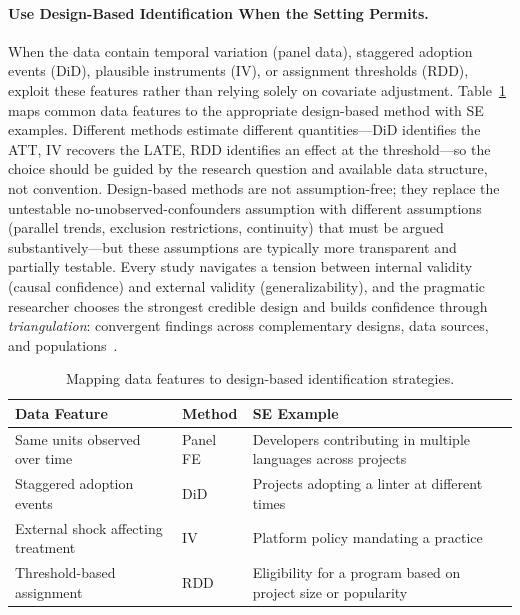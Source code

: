 \paragraph{Use Design-Based Identification When the Setting Permits.}
\label{sec:guide-identification}
\label{sec:guide-path-b}
When the data contain temporal variation (panel data), staggered adoption events (DiD), plausible instruments (IV), or assignment thresholds (RDD), exploit these features rather than relying solely on covariate adjustment.
Table~\ref{tab:design-features} maps common data features to the appropriate design-based method with SE examples.
Different methods estimate different quantities---DiD identifies the ATT, IV recovers the LATE, RDD identifies an effect at the threshold---so the choice should be guided by the research question and available data structure, not convention.
Design-based methods are not assumption-free; they replace the untestable no-unobserved-confounders assumption with different assumptions (parallel trends, exclusion restrictions, continuity) that must be argued substantively---but these assumptions are typically more transparent and partially testable.
Every study navigates a tension between internal validity (causal confidence) and external validity (generalizability), and the pragmatic researcher chooses the strongest credible design and builds confidence through \emph{triangulation}: convergent findings across complementary designs, data sources, and populations~\cite{shadish2002experimental}.

\begin{table}[t]
\centering
\caption{Mapping data features to design-based identification strategies.}
\label{tab:design-features}
\footnotesize
\begin{tabularx}{\linewidth}{@{} p{3.8cm} p{2.2cm} X @{}}
\toprule
\textbf{Data Feature} & \textbf{Method} & \textbf{SE Example} \\
\midrule
Same units observed over time & Panel FE & Developers contributing in multiple languages across projects \\
[0.3em]
Staggered adoption events & DiD & Projects adopting a linter at different times \\
[0.3em]
External shock affecting treatment & IV & Platform policy mandating a practice \\
[0.3em]
Threshold-based assignment & RDD & Eligibility for a program based on project size or popularity\\
\bottomrule
\end{tabularx}
\end{table}

